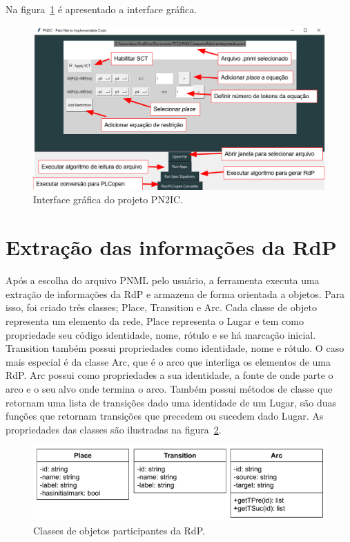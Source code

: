 Na figura~\ref{fig:interfacegrafica} \'e apresentado a interface gr\'afica.

\begin{figure}[!htb]
	\caption[Interface gr\'afica do projeto PN2IC.]{Interface gr\'afica do projeto PN2IC.}
	\label{fig:interfacegrafica}
	\includegraphics[width=16cm]{./figuras/INTERFACE_GRAFICA_PN2IC.png}\centering
\end{figure}

\section{Extra\c{c}\~ao das informa\c{c}\~oes da RdP}
Ap\'os a escolha do arquivo PNML pelo usu\'ario, a ferramenta executa uma extra\c{c}\~ao de informa\c{c}\~oes da RdP e armazena de forma orientada a objetos. Para isso, foi criado tr\^es classes; Place, Transition e Arc. Cada classe de objeto representa um elemento da rede, Place representa o Lugar e tem como propriedade seu c\'odigo identidade, nome, r\'otulo e se h\'a marca\c{c}\~ao inicial. Transition tamb\'em possui propriedades como identidade, nome e r\'otulo.
O caso mais especial \'e da classe Arc, que \'e o arco que interliga os elementos de uma RdP. Arc possui como propriedades a sua identidade, a fonte de onde parte o arco e o seu alvo onde termina o arco. Tamb\'em possui m\'etodos de classe que retornam uma lista de transi\c{c}\~oes dado uma identidade de um Lugar, s\~ao duas fun\c{c}\~oes que retornam transi\c{c}\~oes que precedem ou sucedem dado Lugar. As propriedades das classes s\~ao ilustradas na figura~\ref{fig:classes}.

\begin{figure}[!htb]
	\caption[Classes de objetos participantes da RdP.]{Classes de objetos participantes da RdP.}
	\label{fig:classes}
	\includegraphics[width=16cm]{./figuras/CLASSES.png}\centering
\end{figure}


